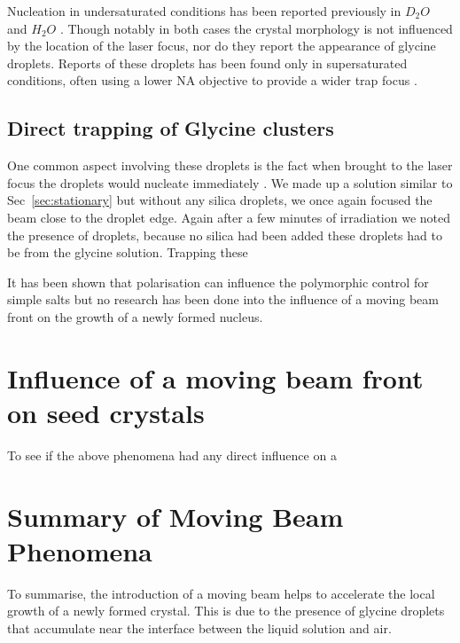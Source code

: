 Nucleation in undersaturated conditions has been reported previously in $D_2O$ 
\cite{Rungsimanon2010} and $H_2O$ \cite{Flannigan2023}. Though notably in both 
cases the crystal morphology is not influenced by the location of the laser focus, nor do they report the appearance of glycine droplets. Reports of these droplets
has been found only in supersaturated conditions, often using a lower NA objective
to provide a wider trap focus \cite{Liao2022, Yuyama2010, Yuyama2012}.  

\subsection{Direct trapping of Glycine clusters}
One common aspect involving these droplets is the fact when brought to the laser 
focus the droplets would nucleate immediately \cite{Liao2022}. We made up a 
solution similar to Sec~\ref{sec:stationary} but without any silica droplets, 
we once again focused the beam close to the droplet edge. Again after a few 
minutes of irradiation we noted the presence of droplets, because no silica had 
been added these droplets had to be from the glycine solution. Trapping these 

It has been shown that polarisation can influence the polymorphic control for 
simple salts \cite{Garetz1996, Garetz2002} but no research has been done into 
the influence of a moving beam front on the growth of a newly formed nucleus.  

\section{Influence of a moving beam front on seed crystals}
To see if the above phenomena had any direct influence on a  

\section{Summary of Moving Beam Phenomena}
To summarise, the introduction of a moving beam helps to accelerate the local
growth of a newly formed crystal. This is due to the presence of glycine droplets
that accumulate near the interface between the liquid solution and air.

